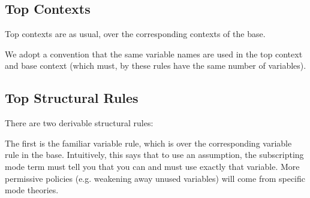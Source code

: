\documentclass[10pt]{article}
\theoremstyle{definition}
\newcommand{\yields}{\vdash}
\newcommand{\tcell}{\Rightarrow}
\newcommand{\CTX}{\,\,\mathsf{Ctx}}
\newcommand{\ctx}{\,\,\mathsf{mctx}}
\newcommand{\TYPE}{\,\,\mathsf{Type}}
\newcommand{\type}{\,\,\mathsf{mode}}
\newcommand{\id}{\mathsf{id}}
\newcommand{\rewrite}[2]{\overleftarrow{#1}(#2)}
\newcommand\StI[2]{\ensuremath{\mathsf{st}_{#1}(#2)}}
\newcommand\TermTwoT[5]{\ensuremath{#1 \vdash {#2} : #3 \tcell_{#5} #4}}
\newcommand\ap[2]{\ensuremath{#1 \langle #2 \rangle }}
\begin{document}
\subsection{Top Contexts}

Top contexts are as usual, over the corresponding contexts of the base.  


We adopt a convention that the same variable names are used in the top
context and base context (which must, by these rules have the same
number of variables).  

\subsection{Top Structural Rules}
\label{sec:top-syntax-structural}

There are two derivable structural rules: 

The first is the familiar variable rule, which is over the corresponding
variable rule in the base.  Intuitively, this says that to use an
assumption, the subscripting mode term must tell you that you can and
must use exactly that variable.  More permissive policies
(e.g. weakening away unused variables) will come from specific mode
theories.
\end{document}
